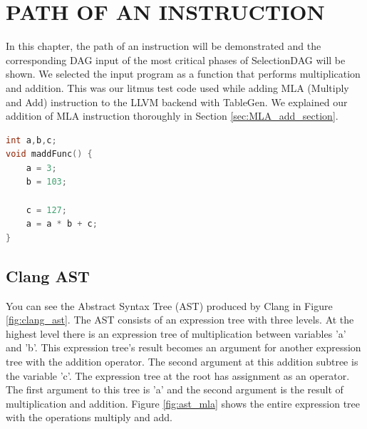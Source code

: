 
\clearpage
\chapter{PATH OF AN INSTRUCTION}\label{Ch4}
In this chapter, the path of an instruction will be demonstrated and the corresponding DAG input of the most critical phases of SelectionDAG will be shown. We selected the input program as a function that performs multiplication and addition. This was our litmus test code used while adding MLA (Multiply and Add) instruction to the LLVM backend with TableGen. We explained our addition of MLA instruction thoroughly in Section \ref{sec:MLA_add_section}. 

\begin{lstlisting}[language=C, caption=madd.c program]
int a,b,c;
void maddFunc() {
	a = 3;
	b = 103;
	
	c = 127;
	a = a * b + c;
}
\end{lstlisting}

\section{Clang AST}
You can see the Abstract Syntax Tree (AST) produced by Clang in Figure \ref{fig:clang_ast}. The AST consists of an expression tree with three levels. At the highest level there is an expression tree of multiplication between variables 'a' and 'b'. This expression tree's result becomes an argument for another expression tree with the addition operator. The second argument at this addition subtree is the variable 'c'. The expression tree at the root has assignment as an operator. The first argument to this tree is 'a' and the second argument is the result of multiplication and addition. Figure \ref{fig:ast_mla} shows the entire expression tree with the operations multiply and add. 

